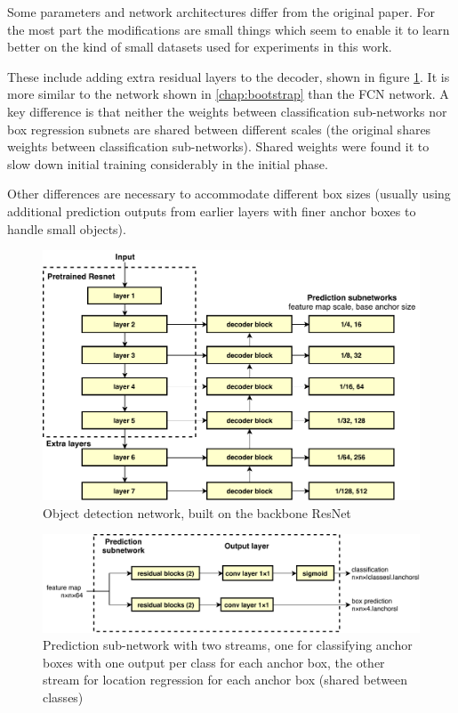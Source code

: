 Some parameters and network architectures differ from the original paper. For the most part the modifications are small things which seem to enable it to learn better on the kind of small datasets used for experiments in this work. 

These include adding extra residual layers to the decoder, shown in figure \ref{fig:detection_network}. It is more similar to the network shown in  \ref{chap:bootstrap} than the \gls{FCN} network. A key difference is that neither the weights between classification sub-networks nor box regression subnets are shared between different scales  (the original shares weights between classification sub-networks). Shared weights were found it to slow down initial training considerably in the initial phase. 

Other differences are necessary to accommodate different box sizes (usually using additional prediction outputs from earlier layers with finer anchor boxes to handle small objects).


\begin{figure}[h]
  \centering
  \includegraphics[width=1.0\linewidth]{figures/annotation/detection_network.pdf}
  \caption{Object detection network, built on the backbone ResNet }  
  \label{fig:detection_network}
\end{figure}

\begin{figure}
  \centering
  \includegraphics[width=1.0\linewidth]{figures/annotation/prediction_subnet.pdf}
  \caption{Prediction sub-network with two streams, one for classifying anchor boxes with one output per class for each anchor box, the other stream for location regression for each anchor box (shared between classes)}    
  \label{fig:prediction_subnet}  
\end{figure}


